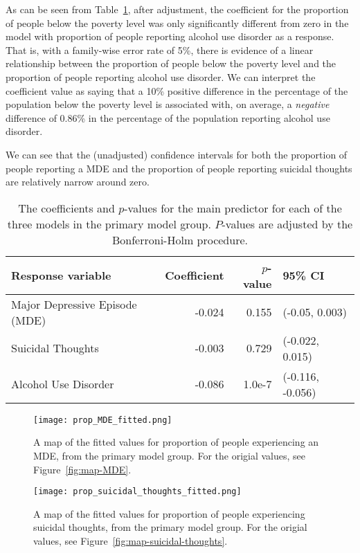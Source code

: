 \documentclass{article}
\begin{document}
As can be seen from Table~\ref{tab:primary-model-results},
after adjustment,
the coefficient for the proportion of people below the poverty level
was only significantly different from zero
in the model with proportion of people reporting
alcohol use disorder as a response.
That is, with a family-wise error rate of 5\%,
there is evidence of a linear relationship between
the proportion of people below the poverty level
and the proportion of people reporting alcohol use disorder.
We can interpret the coefficient value as saying that
a 10\% positive difference in the percentage of the
population below the poverty level
is associated with, on average,
a \textit{negative} difference of 0.86\%
in the percentage of the population
reporting alcohol use disorder.

We can see that the (unadjusted) confidence intervals for both
the proportion of people reporting a MDE
and the proportion of people reporting suicidal thoughts
are relatively narrow around zero.

\begin{table}[t]
\begin{center}
    \begin{tabular}{lrrl}
        \toprule
        Response variable & Coefficient & $p$-value & 95\% CI\\
        \midrule
        Major Depressive Episode (MDE) & -0.024 & 0.155 & (-0.05, 0.003)\\
        Suicidal Thoughts & -0.003 & 0.729 & (-0.022, 0.015)\\
        Alcohol Use Disorder & -0.086 & 1.0e-7 & (-0.116, -0.056)\\
        \bottomrule
    \end{tabular}
\caption{\label{tab:primary-model-results} The coefficients and $p$-values
    for the main predictor for each of the three models
    in the primary model group.
    $P$-values are adjusted by the Bonferroni-Holm procedure.
}
\end{center}
\end{table}

\begin{figure}[!htb]
    \centering
    \texttt{[image: prop\_MDE\_fitted.png]}
    \caption{\label{fig:map-fitted-MDE}
    A map of the fitted values for proportion of people experiencing an
    MDE, from the primary model group. For the origial values, see
    Figure~\ref{fig:map-MDE}.}
\end{figure}

\begin{figure}[!htb]
    \centering
    \texttt{[image: prop\_suicidal\_thoughts\_fitted.png]}
    \caption{\label{fig:map-fitted-suicidal-thoughts}
    A map of the fitted values for proportion of people experiencing
    suicidal thoughts, from the primary model group. For the origial values, see
    Figure~\ref{fig:map-suicidal-thoughts}.}
\end{figure}
\end{document}
